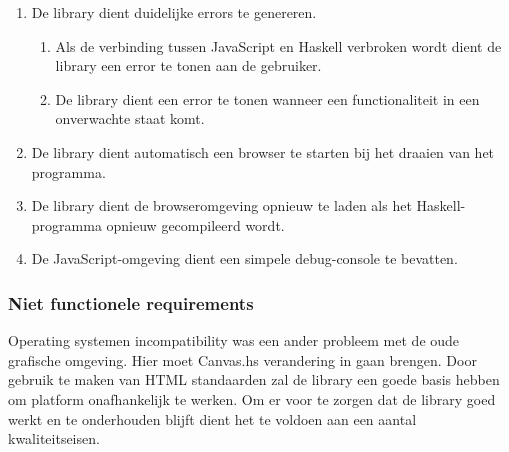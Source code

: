 \begin{enumerate}[label={R\arabic*}]
\setcounter{enumi}{\value{startvalue}}
	\item \label{req:errors} De library dient duidelijke errors te genereren.
	\begin{enumerate}[label={R\arabic{enumi}.\arabic*}]
		\item Als de verbinding tussen JavaScript en Haskell verbroken wordt dient de library een error te tonen aan de gebruiker. 
		\item De library dient een error te tonen wanneer een functionaliteit in een onverwachte staat komt.
	\end{enumerate}
	\item \label{req:launchbrowser} De library dient automatisch een browser te starten bij het draaien van het programma.
	\item \label{req:reload} De library dient de browseromgeving opnieuw te laden als het Haskell-programma opnieuw gecompileerd wordt.
	\item \label{req:debug} De JavaScript-omgeving dient een simpele debug-console te bevatten.
	\setcounter{startvalue}{\value{enumi}}
\end{enumerate}

\subsubsection{Niet functionele requirements}
Operating systemen incompatibility was een ander probleem met de oude grafische omgeving. Hier moet Canvas.hs verandering in gaan brengen. Door gebruik te maken van HTML standaarden zal de library een goede basis hebben om platform onafhankelijk te werken. Om er voor te zorgen dat de library goed werkt en te onderhouden blijft dient het te voldoen aan een aantal kwaliteitseisen.

